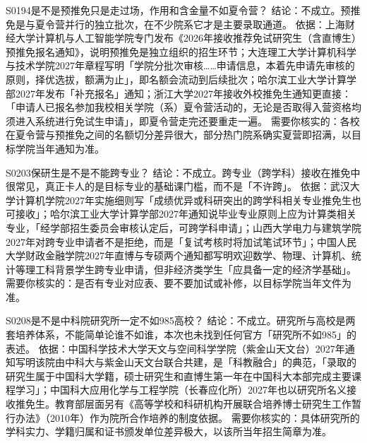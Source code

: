 \begin{qa}{S0194}{是不是预推免只是走过场，作用和含金量不如夏令营？}
结论：不成立。预推免是与夏令营并行的独立批次，在不少院系它才是主要录取通道。
依据：上海财经大学计算机与人工智能学院专门发布《2026年接收推荐免试研究生（含直博生）预推免报名通知》，说明预推免是独立组织的招生环节；大连理工大学计算机科学与技术学院2027年章程写明「学院分批次审核……申请信息，本着先申请先审核的原则，择优选拔，额满为止」，即名额会流动到后续批次；哈尔滨工业大学计算学部2027年发布「补充报名」通知；浙江大学2027年接收外校推免生通知更直接：「申请人已报名参加我校相关学院（系）夏令营活动的，无论是否取得入营资格均须进入系统进行免试生申请」，即夏令营走完还要重走一遍。
需要你核实的：各校在夏令营与预推免之间的名额切分差异很大，部分热门院系确实夏营即招满，以目标学院当年通知为准。
\end{qa}

\begin{qa}{S0203}{保研生是不是不能跨专业？}
结论：不成立。跨专业（跨学科）接收在推免中很常见，真正卡人的是目标专业的基础课门槛，而不是「不许跨」。
依据：武汉大学计算机学院2027年实施细则写「成绩优异或科研突出的跨学科相关专业推免生也可接收」；哈尔滨工业大学计算学部2027年通知说毕业专业原则上应为计算类相关专业，「经学部招生委员会审核认定后，可跨学科申请」；山西大学电力与建筑学院2027年对跨专业申请者不是拒绝，而是「复试考核时将加试笔试环节」；中国人民大学财政金融学院2027年直博与专硕两个通知都写明欢迎数学、物理、计算机、统计等理工科背景学生跨专业申请，但非经济类学生「应具备一定的经济学基础」。
需要你核实的：是否有专业对应表、要不要加试或补修，以目标学院当年文件为准。
\end{qa}

\begin{qa}{S0208}{是不是中科院研究所一定不如985高校？}
结论：不成立。研究所与高校是两套培养体系，不能简单论谁不如谁，本次也未找到任何官方「研究所不如985」的表述。
依据：中国科学技术大学天文与空间科学学院（紫金山天文台）2027年通知写明该院由中科大与紫金山天文台联合共建，是「科教融合」的典范，「录取的研究生属于中国科大学籍，硕士研究生和直博生第一年在中国科大本部完成主要课程学习」；中国科大应用化学与工程学院（长春应化所）2027年也以研究所名义接收推免生。教育部层面另有《高等学校和科研机构开展联合培养博士研究生工作暂行办法》（2010年）作为院所合作培养的制度依据。
需要你核实的：具体研究所的学科实力、学籍归属和证书颁发单位差异极大，以该所当年招生简章为准。
\end{qa}


